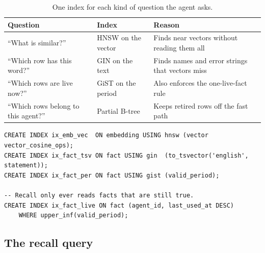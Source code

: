 \documentclass[11pt,a4paper]{article}
\begin{document}
\begin{table}[H]
\centering
\caption[Indexes by question]{One index for each kind of question the agent asks.}
\label{tab:index}
{\small
\begin{tabularx}{\textwidth}{L{3.0cm} L{2.6cm} X}
\toprule
\sffamily\bfseries Question & \sffamily\bfseries Index &
\sffamily\bfseries Reason \\
\midrule
``What is similar?'' & HNSW on the vector & Finds near vectors without
reading them all \\
``Which row has this word?'' & GIN on the text & Finds names and error
strings that vectors miss \\
``Which rows are live now?'' & GiST on the period & Also enforces the
one-live-fact rule \\
``Which rows belong to this agent?'' & Partial B-tree & Keeps retired
rows off the fast path \\
\bottomrule
\end{tabularx}}
\end{table}

\begin{lstlisting}[style=sql,caption={The indexes.}]
CREATE INDEX ix_emb_vec  ON embedding USING hnsw (vector vector_cosine_ops);
CREATE INDEX ix_fact_tsv ON fact USING gin  (to_tsvector('english', statement));
CREATE INDEX ix_fact_per ON fact USING gist (valid_period);

-- Recall only ever reads facts that are still true.
CREATE INDEX ix_fact_live ON fact (agent_id, last_used_at DESC)
    WHERE upper_inf(valid_period);
\end{lstlisting}

\subsection{The recall query}
\end{document}
